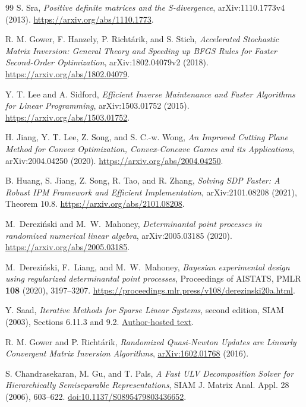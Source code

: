 \documentclass[11pt]{amsart}
\theoremstyle{definition}\newtheorem{definition}[theorem]{Definition}
\theoremstyle{remark}\newtheorem{remark}[theorem]{Remark}
\numberwithin{equation}{section}
\begin{document}
\begin{thebibliography}{99}
 S. Sra, \emph{Positive definite matrices and the S-divergence},
arXiv:1110.1773v4 (2013).
\url{https://arxiv.org/abs/1110.1773}.

 R. M. Gower, F. Hanzely, P. Richt\'arik, and S. Stich,
\emph{Accelerated Stochastic Matrix Inversion: General Theory and Speeding
up BFGS Rules for Faster Second-Order Optimization},
arXiv:1802.04079v2 (2018).
\url{https://arxiv.org/abs/1802.04079}.

 Y. T. Lee and A. Sidford,
\emph{Efficient Inverse Maintenance and Faster Algorithms for Linear Programming},
arXiv:1503.01752 (2015). \url{https://arxiv.org/abs/1503.01752}.

 H. Jiang, Y. T. Lee, Z. Song, and S. C.-w. Wong,
\emph{An Improved Cutting Plane Method for Convex Optimization,
Convex-Concave Games and its Applications}, arXiv:2004.04250 (2020).
\url{https://arxiv.org/abs/2004.04250}.

 B. Huang, S. Jiang, Z. Song, R. Tao, and R. Zhang,
\emph{Solving SDP Faster: A Robust IPM Framework and Efficient Implementation},
arXiv:2101.08208 (2021), Theorem 10.8.
\url{https://arxiv.org/abs/2101.08208}.

M.~Derezi\'nski and M.~W.~Mahoney,
\emph{Determinantal point processes in randomized numerical linear algebra},
arXiv:2005.03185 (2020).
\url{https://arxiv.org/abs/2005.03185}.

M.~Derezi\'nski, F.~Liang, and M.~W.~Mahoney,
\emph{Bayesian experimental design using regularized determinantal point processes},
Proceedings of AISTATS, PMLR \textbf{108} (2020), 3197--3207.
\url{https://proceedings.mlr.press/v108/derezinski20a.html}.

 Y. Saad, \emph{Iterative Methods for Sparse Linear Systems},
second edition, SIAM (2003), Sections 6.11.3 and 9.2.
\href{https://www-users.cse.umn.edu/~saad/IterMethBook_2ndEd.pdf}{Author-hosted text}.

 R. M. Gower and P. Richt\'arik,
\emph{Randomized Quasi-Newton Updates are Linearly Convergent Matrix
Inversion Algorithms},
\href{https://arxiv.org/abs/1602.01768}{arXiv:1602.01768} (2016).

 S. Chandrasekaran, M. Gu, and T. Pals,
\emph{A Fast ULV Decomposition Solver for Hierarchically Semiseparable
Representations}, SIAM J. Matrix Anal. Appl. 28 (2006), 603--622.
\href{https://doi.org/10.1137/S0895479803436652}{doi:10.1137/S0895479803436652}.


\end{thebibliography}
\end{document}
